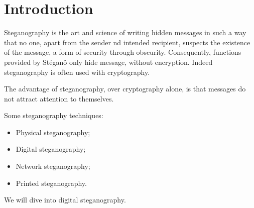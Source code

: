 \section{Introduction}
Steganography is the art and science of writing hidden messages in such a way
that no one, apart from the sender nd intended recipient, suspects the
existence of the message, a form of security through obscurity. Consequently,
functions provided by Stéganô only hide message, without encryption. Indeed
steganography is often used with cryptography.

The advantage of steganography, over cryptography alone, is that messages do
not attract attention to themselves.

\bigskip
Some steganography techniques:
\begin{itemize}
    \item Physical steganography;
    \item Digital steganography;
    \item Network steganography;
    \item Printed steganography.
\end{itemize}

We will dive into digital steganography.